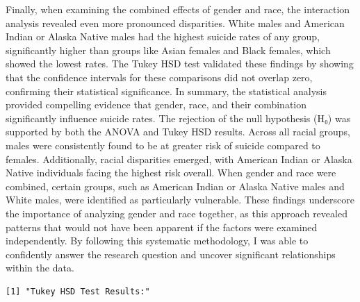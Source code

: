 \documentclass[
  letterpaper,
  DIV=11,
  numbers=noendperiod]{scrartcl}
\begin{document}
Finally, when examining the combined effects of gender and race, the
interaction analysis revealed even more pronounced disparities. White
males and American Indian or Alaska Native males had the highest suicide
rates of any group, significantly higher than groups like Asian females
and Black females, which showed the lowest rates. The Tukey HSD test
validated these findings by showing that the confidence intervals for
these comparisons did not overlap zero, confirming their statistical
significance. In summary, the statistical analysis provided compelling
evidence that gender, race, and their combination significantly
influence suicide rates. The rejection of the null hypothesis (H₀) was
supported by both the ANOVA and Tukey HSD results. Across all racial
groups, males were consistently found to be at greater risk of suicide
compared to females. Additionally, racial disparities emerged, with
American Indian or Alaska Native individuals facing the highest risk
overall. When gender and race were combined, certain groups, such as
American Indian or Alaska Native males and White males, were identified
as particularly vulnerable. These findings underscore the importance of
analyzing gender and race together, as this approach revealed patterns
that would not have been apparent if the factors were examined
independently. By following this systematic methodology, I was able to
confidently answer the research question and uncover significant
relationships within the data.

\begin{verbatim}
[1] "Tukey HSD Test Results:"
\end{verbatim}
\end{document}
